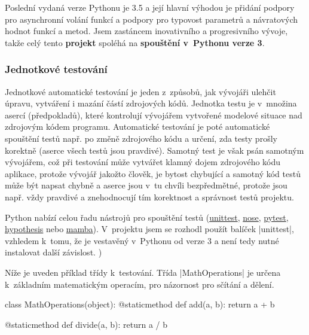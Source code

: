 Poslední vydaná verze Pythonu je 3.5 a její hlavní výhodou je přidání podpory pro asynchronní volání funkcí a podpory pro typovost parametrů a návratových hodnot funkcí a metod. Jsem zastáncem inovativního a progresivního vývoje, takže celý tento \textbf{projekt} spoléhá na \textbf{spouštění v~Pythonu verze 3}.

\subsubsection{Jednotkové testování}
\label{subsubsec:unit-testing}

\begin{sloppypar}
	Jednotkové automatické testování je jeden z~způsobů, jak vývojáři ulehčit úpravu, vytváření i mazání částí zdrojových kódů. Jednotka testu je v~množina asercí (předpokladů), které kontrolují vývojářem vytvořené modelové situace nad zdrojovým kódem programu. Automatické testování je poté automatické spouštění testů např. po změně zdrojového kódu a určení, zda testy prošly korektně (aserce všech testů jsou pravdivé). Samotný test je však psán samotným vývojářem, což při testování může vytvářet klamný dojem  zdrojového kódu aplikace, protože vývojář jakožto člověk, je bytost chybující a samotný kód testů může být napsat chybně a aserce jsou v~tu chvíli bezpředmětné, protože jsou např. vždy pravdivé a znehodnocují tím korektnost a správnost testů projektu.

	Python nabízí celou řadu nástrojů pro spouštění testů (\href{https://docs.python.org/3/library/unittest.html}{unittest}, \href{https://nose.readthedocs.org/en/latest/}{nose}, \href{http://pytest.org/latest/}{pytest}, \href{https://github.com/DRMacIver/hypothesis}{hypothesis} nebo \href{http://nestorsalceda.github.io/mamba/}{mamba}). V~projektu jsem se rozhodl použít balíček \ic|unittest|, vzhledem k~tomu, že je vestavěný v~Pythonu od verze 3 a není tedy nutné instalovat další závislost.
)
\end{sloppypar}

Níže je uveden příklad třídy k~testování. Třída \ic|MathOperations| je určena k~základním matematickým operacím, pro názornost pro sčítání a dělení.

\begin{code}[caption={Příklad třídy $MathOperations$ k~testování}]
class MathOperations(object):
	@staticmethod
	def add(a, b):
		return a + b

	@staticmethod
	def divide(a, b):
		return a / b
\end{code}


